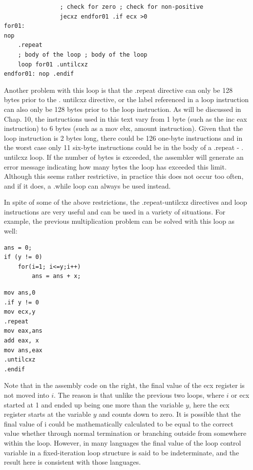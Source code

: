 \documentclass[10pt]{article}
\begin{document}
\begin{verbatim}
                ; check for zero ; check for non-positive
                jecxz endfor01 .if ecx >0
for01:
nop
    .repeat
    ; body of the loop ; body of the loop
    loop for01 .untilcxz
endfor01: nop .endif
\end{verbatim}

Another problem with this loop is that the .repeat directive can only be 128 bytes prior to the . untilcxz directive, or the label referenced in a loop instruction can also only be 128 bytes prior to the loop instruction. As will be discussed in Chap. 10, the instructions used in this text vary from 1 byte (such as the inc eax instruction) to 6 bytes (such as a mov ebx, amount instruction). Given that the loop instruction is 2 bytes long, there could be 126 one-byte instructions and in the worst case only 11 six-byte instructions could be in the body of a .repeat - . untilcxz loop. If the number of bytes is exceeded, the assembler will generate an error message indicating how many bytes the loop has exceeded this limit. Although this seems rather restrictive, in practice this does not occur too often, and if it does, a .while loop can always be used instead.

In spite of some of the above restrictions, the .repeat-untilcxz directives and loop instructions are very useful and can be used in a variety of situations. For example, the previous multiplication problem can be solved with this loop as well:

\begin{verbatim}
ans = 0;
if (y != 0)
    for(i=1; i<=y;i++)
        ans = ans + x;
\end{verbatim}

\begin{verbatim}
mov ans,0
.if y != 0
mov ecx,y
.repeat
mov eax,ans
add eax, x
mov ans,eax
.untilcxz
.endif
\end{verbatim}

Note that in the assembly code on the right, the final value of the ecx register is not moved into $i$. The reason is that unlike the previous two loops, where $i$ or ecx started at 1 and ended up being one more than the variable $y$, here the ecx register starts at the variable $y$ and counts down to zero. It is possible that the final value of i could be mathematically calculated to be equal to the correct value whether through normal termination or branching outside from somewhere within the loop. However, in many languages the final value of the loop control variable in a fixed-iteration loop structure is said to be indeterminate, and the result here is consistent with those languages.
\end{document}
